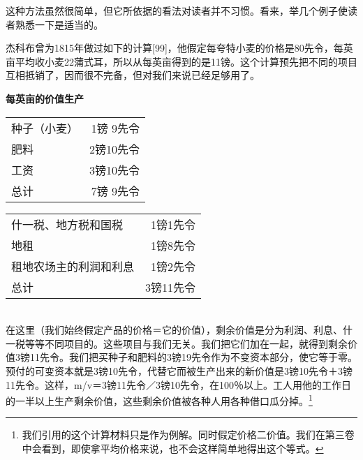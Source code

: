 \documentclass{ctexbook}
\begin{document}
    这种方法虽然很简单，但它所依据的看法对读者并不习惯。看来，举几个例子使读者熟悉一下是适当的。
    
    杰科布曾为1815年做过如下的计算[99]，他假定每夸特小麦的价格是80先令，每英亩平均收小麦22蒲式耳，所以从每英亩得到的是11镑。这个计算预先把不同的项目互相抵销了，因而很不完备，但对我们来说已经足够用了。

    \begin{center}
        \textbf{每英亩的价值生产}
    \end{center}

    \begin{tabular}{lr|}
        种子（小麦）&1镑 9先令\\
        肥料&2镑10先令\\
        工资&3镑10先令\\
        总计&7镑 9先令
    \end{tabular}
    \begin{tabular}{|lr}
        什一税、地方税和国税&1镑1先令\\
        地租&1镑8先令\\
        租地农场主的利润和利息&1镑2先令\\
        总计&3镑11先令\\
    \end{tabular}\\

    在这里（我们始终假定产品的价格＝它的价值），剩余价值是分为利润、利息、什一税等等不同项目的。这些项目与我们无关。我们把它们加在一起，就得到剩余价值3镑11先令。我们把买种子和肥料的3镑19先令作为不变资本部分，使它等于零。预付的可变资本就是3镑10先令，代替它而被生产出来的新价值是3镑10先令＋3镑11先令。这样，m/v＝3镑11先令／3镑10先令，在100％以上。工人用他的工作日的一半以上生产剩余价值，这些剩余价值被各种人用各种借口瓜分掉。\footnote{我们引用的这个计算材料只是作为例解。同时假定价格二价值。我们在第三卷中会看到，即使拿平均价格来说，也不会这样简单地得出这个等式。}
\end{document}
